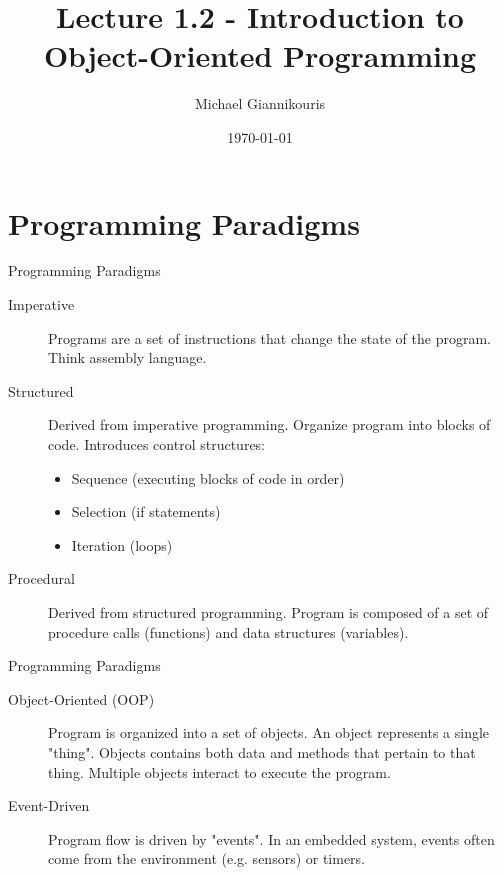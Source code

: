 \documentclass{beamer}
\title{Lecture 1.2 - Introduction to Object-Oriented Programming}
\date{\today}
\author{Michael Giannikouris}
\institute{Department of Electrical and Computer Engineering}
\begin{document}
\maketitle

\section{Programming Paradigms}
  
\begin{frame}{Programming Paradigms}
	\begin{description}
		\item[Imperative]		
		Programs are a set of instructions that change the state of the program. Think assembly language.
		
		\item[Structured]
		Derived from imperative programming. Organize program into blocks of code. Introduces control structures:
		
		\begin{itemize}
			\item Sequence	(executing blocks of code in order)
			\item Selection (if statements)
			\item Iteration (loops)
		\end{itemize}
		
		\item[Procedural]
		Derived from structured programming. Program is composed of a set of procedure calls (functions) and data structures (variables).

	\end{description}
\end{frame}  
  
\begin{frame}{Programming Paradigms}

	\begin{description}
		\item[Object-Oriented (OOP)]
		Program is organized into a set of objects. An object represents a single "thing". Objects contains both data and methods that pertain to that thing. Multiple objects interact to execute the program.
		
		\item[Event-Driven]
		Program flow is driven by "events". In an embedded system, events often come from the environment (e.g. sensors) or timers.
	\end{description}
\end{frame}  
\end{document}
